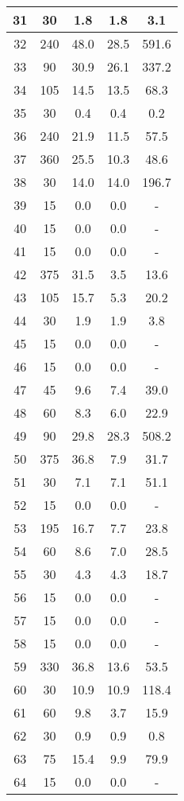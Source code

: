 \documentclass[a4paper,10pt]{article}
\begin{document}
\begin{table}
\begin{tabular}{|c|c|c|c|c|}
\hline
31 & 30 & 1.8 & 1.8 & 3.1 \\
\hline
32 & 240 & 48.0 & 28.5 & 591.6 \\
\hline
33 & 90 & 30.9 & 26.1 & 337.2 \\
\hline
34 & 105 & 14.5 & 13.5 & 68.3 \\
\hline
35 & 30 & 0.4 & 0.4 & 0.2 \\
\hline
36 & 240 & 21.9 & 11.5 & 57.5 \\
\hline
37 & 360 & 25.5 & 10.3 & 48.6 \\
\hline
38 & 30 & 14.0 & 14.0 & 196.7 \\
\hline
39 & 15 & 0.0 & 0.0 & - \\
\hline
40 & 15 & 0.0 & 0.0 & - \\
\hline
41 & 15 & 0.0 & 0.0 & - \\
\hline
42 & 375 & 31.5 & 3.5 & 13.6 \\
\hline
43 & 105 & 15.7 & 5.3 & 20.2 \\
\hline
44 & 30 & 1.9 & 1.9 & 3.8 \\
\hline
45 & 15 & 0.0 & 0.0 & - \\
\hline
46 & 15 & 0.0 & 0.0 & - \\
\hline
47 & 45 & 9.6 & 7.4 & 39.0 \\
\hline
48 & 60 & 8.3 & 6.0 & 22.9 \\
\hline
49 & 90 & 29.8 & 28.3 & 508.2 \\
\hline
50 & 375 & 36.8 & 7.9 & 31.7 \\
\hline
51 & 30 & 7.1 & 7.1 & 51.1 \\
\hline
52 & 15 & 0.0 & 0.0 & - \\
\hline
53 & 195 & 16.7 & 7.7 & 23.8 \\
\hline
54 & 60 & 8.6 & 7.0 & 28.5 \\
\hline
55 & 30 & 4.3 & 4.3 & 18.7 \\
\hline
56 & 15 & 0.0 & 0.0 & - \\
\hline
57 & 15 & 0.0 & 0.0 & - \\
\hline
58 & 15 & 0.0 & 0.0 & - \\
\hline
59 & 330 & 36.8 & 13.6 & 53.5 \\
\hline
60 & 30 & 10.9 & 10.9 & 118.4 \\
\hline
61 & 60 & 9.8 & 3.7 & 15.9 \\
\hline
62 & 30 & 0.9 & 0.9 & 0.8 \\
\hline
63 & 75 & 15.4 & 9.9 & 79.9 \\
\hline
64 & 15 & 0.0 & 0.0 & - \\

\end{tabular}
\end{table}
\end{document}
